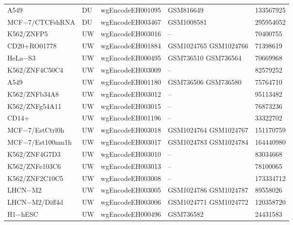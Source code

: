 \documentclass[11pt]{article}
\begin{document}
\begin{longtable}{p{3.5cm}p{1cm}p{4cm}p{2.8cm}p{3cm}}
A549 & DU & wgEncodeEH001095 & GSM816649 & 133567925 \\
MCF−7/CTCFshRNA & DU & wgEncodeEH003467 & GSM1008581 & 295954052 \\
K562/ZNFP5 & UW & wgEncodeEH003016 & -- & 70400755 \\
CD20+RO01778 & UW & wgEncodeEH001884 & GSM1024765 \newline GSM1024766 & 71398619 \\
HeLa−S3 & UW & wgEncodeEH000495 & GSM736510 \newline GSM736564 & 70669968 \\
K562/ZNF4C50C4 & UW & wgEncodeEH003009 & -- & 82579252 \\
A549 & UW & wgEncodeEH001180 & GSM736506 \newline GSM736580 & 75764710 \\
K562/ZNFb34A8 & UW & wgEncodeEH003012 & -- & 95113482 \\
K562/ZNFg54A11 & UW & wgEncodeEH003015 & -- & 76873236 \\
CD14+ & UW & wgEncodeEH001196 & -- & 33322702 \\
MCF−7/EstCtrl0h & UW & wgEncodeEH003018 & GSM1024764 \newline GSM1024767 & 151170759 \\
MCF−7/Est100nm1h & UW & wgEncodeEH003017 & GSM1024783 \newline GSM1024784 & 164440980 \\
K562/ZNF4G7D3 & UW & wgEncodeEH003010 & -- & 83034668 \\
K562/ZNFe103C6 & UW & wgEncodeEH003013 & -- & 78100065 \\
K562/ZNF2C10C5 & UW & wgEncodeEH003008 & -- & 173334712 \\
LHCN−M2 & UW & wgEncodeEH003005 & GSM1024786 \newline GSM1024787 & 89558026 \\
LHCN−M2/Diff4d & UW & wgEncodeEH003006 & GSM1024771 \newline GSM1024772 & 120358720 \\
H1−hESC & UW & wgEncodeEH000496 & GSM736582 & 24431583 \\

\end{longtable}
\end{document}
